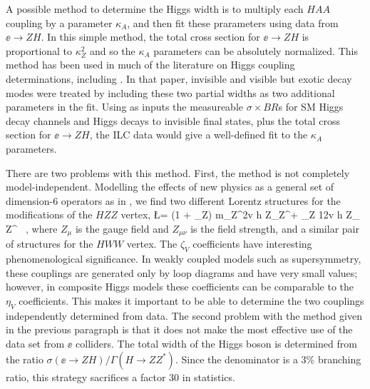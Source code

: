 A possible method to determine the Higgs width is to multiply each $HAA$ coupling by a parameter $\kappa_A$, and then fit these prarameters using data from $\ee\to ZH$.   In this simple method, the total cross section for $\ee\to ZH$ is proportional to $\kappa_Z^2$ and so the $\kappa_A$ parameters can be absolutely normalized.   This method has been used in much of the literature on Higgs coupling determinations, including \cite{Fujii:2015jha}.  In that paper, invisible and visible but exotic decay modes were treated by including these two partial widths as two additional parameters in the fit.  Using as inputs the measureable $\sigma\times BR$s for SM Higgs decay channels and Higgs decays to invisible final states, plus the total cross section for $\ee\to ZH$,  the ILC data would give a well-defined fit to the $\kappa_A$ parameters.

There are two problems with this method.  First, the method is not completely model-independent.  Modelling the effects of new physics as a general set of dimension-6 operators as in , we find two different Lorentz structures for the modifications of the $HZZ$ vertex,
\beq
   \Delta \L =    (1 + \eta_Z) {m_Z^2\over v}  h Z_\mu Z^\mu + \zeta_Z {1\over 2v} h
   Z_{\mu\nu} Z^{\mu\nu} \ ,
where $Z_\mu$ is the gauge field and $Z_{\mu\nu}$ is the field strength, 
and a similar pair of structures for the $HWW$ vertex. The $\zeta_V$ coefficients have interesting phenomenological significance.    In weakly coupled models such as supersymmetry, these couplings are generated only by loop diagrams and have very small values; however, in composite Higgs models these coefficients 
can be comparable to the $\eta_V$ coefficients.   This makes it important to be able to determine the two couplings independently determined from data. The second problem with the method given in the previous paragraph is that it does not make the most effective use of the data set from $\ee$ colliders.  The total width of the Higgs boson is determined from the ratio  $\sigma(\ee\to ZH)/\Gamma(H\to ZZ^*)$.  Since the denominator is a 3\% branching ratio, this strategy sacrifices a factor 30 in 
statistics.

